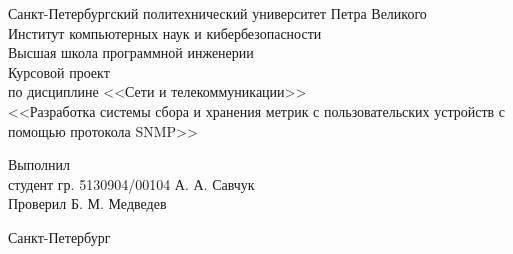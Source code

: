 \begin{titlepage}

	\begin{center}
	  Санкт-Петербургский политехнический университет Петра Великого\\
	  Институт компьютерных наук и кибербезопасности\\
	  Высшая школа программной инженерии\\[8cm]

	  {\LARGE Курсовой проект}\\[0.5cm]
	  \noindent по дисциплине <<Сети и телекоммуникации>>\\
	  \noindent <<Разработка системы сбора и хранения метрик с пользовательских устройств с помощью протокола SNMP>>
	  \\[5cm]
	\end{center}

	  \noindent Выполнил\\
	  \noindent студент гр. 5130904/00104 \hfill А. А. Савчук\\

	  \noindent Проверил \hfill Б. М. Медведев

	\vfill

	\begin{center}
	  Санкт-Петербург\\
	  \the\year
	\end{center}

\end{titlepage}
